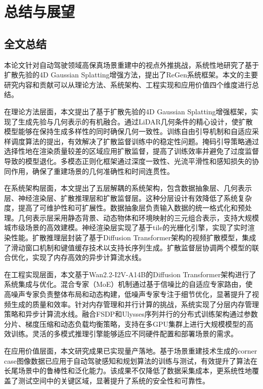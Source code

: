 
\chapter{总结与展望}

\section{全文总结}

本论文针对自动驾驶领域高保真场景重建中的视点外推挑战，系统性地研究了基于扩散先验的4D Gaussian Splatting增强方法，提出了ReGen系统框架。本文的主要研究内容和贡献可以从理论方法、系统架构、工程实现和应用价值四个维度进行总结。

在理论方法层面，本文提出了基于扩散先验的4D Gaussian Splatting增强框架，实现了生成先验与几何表示的有机融合。通过LiDAR几何条件的精心设计，使扩散模型能够在保持生成多样性的同时确保几何一致性。训练自由引导机制和自适应采样调度算法的提出，有效解决了扩散监督训练中的稳定性问题。掩码引导策略通过选择性地在渲染质量较差的区域应用扩散监督，提高了训练效率并避免了过度监督导致的模型退化。多模态正则化框架通过深度一致性、光流平滑性和感知损失的协同作用，确保了重建场景的几何准确性和时间连贯性。

在系统架构层面，本文提出了五层解耦的系统架构，包含数据抽象层、几何表示层、神经渲染层、扩散推理层和扩散监督层。这种分层设计有效降低了系统复杂度，提高了可维护性和可扩展性。数据抽象层负责输入数据的统一格式化和预处理。几何表示层采用静态背景、动态物体和环境映射的三元组合表示，支持大规模城市级场景的高效建模。神经渲染层实现了基于tile的光栅化引擎，实现了实时渲染性能。扩散推理层封装了基于Diffusion Transformer架构的视频扩散模型，集成了滑动窗口机制和键值缓存技术以支持长序列生成。扩散监督层协调两个模型的联合优化，实现了内存高效的异步计算流水线。

在工程实现层面，本文基于Wan2.2-I2V-A14B的Diffusion Transformer架构进行了系统集成与优化。混合专家（MoE）机制通过基于信噪比的自适应专家路由，使高噪声专家负责整体布局和动态构建，低噪声专家专注于细节优化，显著提升了视频生成的质量和效率。针对内存管理和并行计算的挑战，系统实现了分层内存管理策略和异步计算流水线。融合FSDP和Ulysses序列并行的分布式训练架构通过参数分片、梯度压缩和动态负载均衡策略，支持在多GPU集群上进行大规模模型的高效训练。灵活的多模式推理引擎能够适应不同硬件配置和部署场景的需求。

在应用价值层面，本文研究成果已实现量产落地。基于场景重建技术生成的corner case图像数据已应用于自动驾驶感知和规划算法的训练与测试，有效提升了算法在长尾场景中的鲁棒性和泛化能力。该成果不仅降低了数据采集成本，更系统性地覆盖了测试空间中的关键区域，显著提升了系统的安全性和可靠性。

